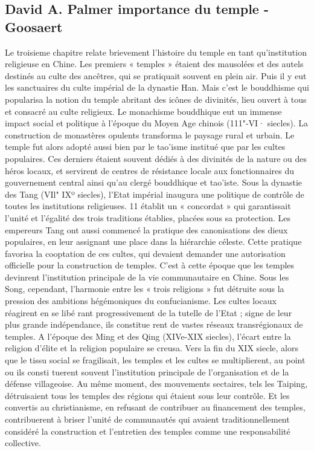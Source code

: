 \subsection{David A. Palmer importance du temple - Goosaert}

\begin{singlequote}
    
Le troisieme chapitre relate brievement l'histoire du temple en tant qu'institution religieuse en Chine. Les premiers « temples » étaient des mausolées et des autels destinés au culte des ancêtres, qui se pratiquait souvent en plein air. Puis il y eut les sanctuaires du culte impérial de la dynastie Han. Mais c'est le bouddhisme qui popularisa la notion du temple abritant des icônes de divinités, lieu ouvert à tous et consacré au culte religieux.
Le monachisme bouddhique eut un immense impact social et politique à l'époque du Moyen  Age chinois (111"-VI· siecles). La construction de monastères opulents transforma le paysage rural et urbain. Le temple fut alors adopté aussi bien par le tao'isme institué que par les cultes populaires. Ces derniers étaient souvent dédiés à des divinités de la nature ou des héros locaux, et servirent de centres de résistance locale aux fonctionnaires du gouvernement central ainsi qu'au clergé bouddhique et tao'iste. Sous la dynastie des Tang (VIl"  IXº siecles), l'Etat impérial inaugura une politique de contrôle de toutes les institutions religieuses. 11 établit un « concordat » qui garantissait l'unité et l'égalité des trois traditions établies, placées sous sa protection. Les empereurs Tang ont aussi commencé la pratique des canonisations des dieux populaires, en leur assignant une place dans la hiérarchie céleste. Cette pratique favorisa la cooptation de ces cultes, qui devaient demander une
autorisation officielle pour la construction de temples. C'est à cette époque que les temples devinrent l'institution principale de la vie communautaire en Chine. Sous les Song, cependant, l'harmonie entre les « trois religions » fut détruite sous la pression des ambitions hégémoniques du confucianisme. Les cultes locaux réagirent en se libé  rant progressivement de la tutelle de l'Etat ; signe de leur plus grande indépendance, ils constitue  rent de vastes réseaux transrégionaux de temples. A l'époque des Ming et des Qing (XIVe-XIX siecles), l'écart entre la religion d'élite et la religion populaire se creusa. Vers la fin du XIX siecle, alors que le tissu social se fragilisait, les temples et les cultes se multiplierent, au point ou ils consti  tuerent souvent l'institution principale de l'organisation et de la défense villageoise. Au même moment, des mouvements sectaires, tels les Taiping, détruisaient tous les temples des régions qui étaient sous leur contrôle. Et les convertis au christianisme, en refusant de contribuer au financement des temples, contribuerent à briser l'unité de communautés qui avaient traditionnellement considéré la construction et l'entretien des temples comme une responsabilité collective.

\end{singlequote}
